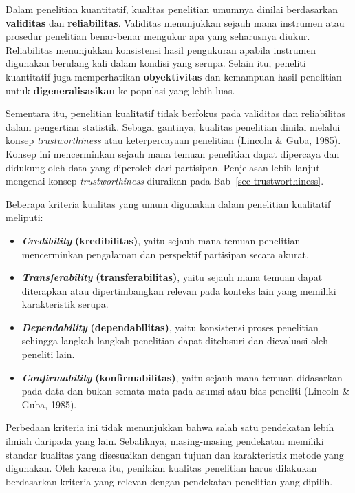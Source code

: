 \documentclass[
  indonesian,
  letterpaper,
  DIV=11,
  numbers=noendperiod]{scrreprt}
\providecommand{\tightlist}{%
  \setlength{\itemsep}{0pt}\setlength{\parskip}{0pt}}
\begin{document}
Dalam penelitian kuantitatif, kualitas penelitian umumnya dinilai
berdasarkan \textbf{validitas} dan \textbf{reliabilitas}. Validitas
menunjukkan sejauh mana instrumen atau prosedur penelitian benar-benar
mengukur apa yang seharusnya diukur. Reliabilitas menunjukkan
konsistensi hasil pengukuran apabila instrumen digunakan berulang kali
dalam kondisi yang serupa. Selain itu, peneliti kuantitatif juga
memperhatikan \textbf{obyektivitas} dan kemampuan hasil penelitian untuk
\textbf{digeneralisasikan} ke populasi yang lebih luas.

Sementara itu, penelitian kualitatif tidak berfokus pada validitas dan
reliabilitas dalam pengertian statistik. Sebagai gantinya, kualitas
penelitian dinilai melalui konsep \emph{trustworthiness} atau
keterpercayaan penelitian (Lincoln \& Guba, 1985). Konsep ini
mencerminkan sejauh mana temuan penelitian dapat dipercaya dan didukung
oleh data yang diperoleh dari partisipan. Penjelasan lebih lanjut
mengenai konsep \emph{trustworthiness} diuraikan pada
Bab~\ref{sec-trustworthiness}.

Beberapa kriteria kualitas yang umum digunakan dalam penelitian
kualitatif meliputi:

\begin{itemize}
\tightlist
\item
  \textbf{\emph{Credibility}} \textbf{(kredibilitas)}, yaitu sejauh mana
  temuan penelitian mencerminkan pengalaman dan perspektif partisipan
  secara akurat.
\item
  \textbf{\emph{Transferability}} \textbf{(transferabilitas)}, yaitu
  sejauh mana temuan dapat diterapkan atau dipertimbangkan relevan pada
  konteks lain yang memiliki karakteristik serupa.
\item
  \textbf{\emph{Dependability}} \textbf{(dependabilitas)}, yaitu
  konsistensi proses penelitian sehingga langkah-langkah penelitian
  dapat ditelusuri dan dievaluasi oleh peneliti lain.
\item
  \textbf{\emph{Confirmability}} \textbf{(konfirmabilitas)}, yaitu
  sejauh mana temuan didasarkan pada data dan bukan semata-mata pada
  asumsi atau bias peneliti (Lincoln \& Guba, 1985).
\end{itemize}

Perbedaan kriteria ini tidak menunjukkan bahwa salah satu pendekatan
lebih ilmiah daripada yang lain. Sebaliknya, masing-masing pendekatan
memiliki standar kualitas yang disesuaikan dengan tujuan dan
karakteristik metode yang digunakan. Oleh karena itu, penilaian kualitas
penelitian harus dilakukan berdasarkan kriteria yang relevan dengan
pendekatan penelitian yang dipilih.
\end{document}
